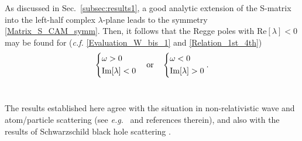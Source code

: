 \documentclass[aps,prd,longbibliography,reprint,twocolumn,amsmath,amssymb,amsfonts,showpacs,footnote,superscriptaddress]{revtex4-1}%
\begin{document}

As discussed in Sec.~\ref{subsec:results1}, a good analytic extension of the S-matrix into the left-half complex $\lambda$-plane leads to the symmetry \eqref{Matrix_S_CAM_symm}. Then, it follows that the Regge poles with $\text{Re}[\lambda] < 0 $ may be found for (\textit{c.f.} \eqref{Evaluation_W_bis_1} and \eqref{Relation_1st_4th})
%
\begin{equation}
    \begin{dcases}
        \omega>0 \\
        \text{Im}[\lambda]<0
     \end{dcases}
\quad\text{or}\quad
    \begin{dcases}
      \omega<0 \\
        \text{Im}[\lambda]>0
    \end{dcases}.
\end{equation}\

The results established here agree with the situation in non-relativistic wave and atom/particle scattering (see \textit{e.g.}~\cite{Newton:1982qc,Bottino1962} and references therein), and also with the results of Schwarzschild black hole scattering \cite{Andersson:1994rk,Decanini:2009mu}.




\end{document}

